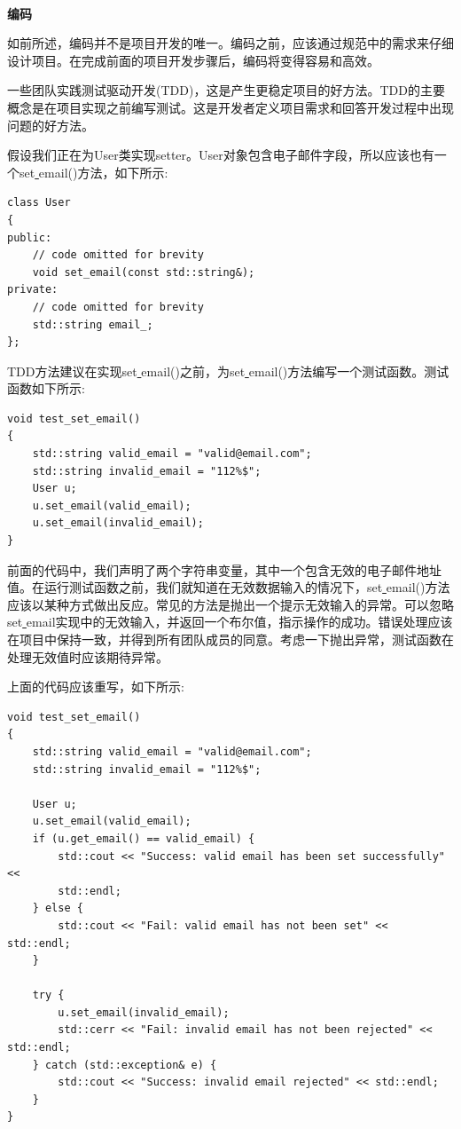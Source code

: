 \noindent\textbf{}\ \par
\textbf{编码} \ \par
如前所述，编码并不是项目开发的唯一。编码之前，应该通过规范中的需求来仔细设计项目。在完成前面的项目开发步骤后，编码将变得容易和高效。 \par
一些团队实践测试驱动开发(TDD)，这是产生更稳定项目的好方法。TDD的主要概念是在项目实现之前编写测试。这是开发者定义项目需求和回答开发过程中出现问题的好方法。 \par
假设我们正在为User类实现setter。User对象包含电子邮件字段，所以应该也有一个set\underline{ }email()方法，如下所示: \par

\begin{lstlisting}[caption={}]
class User
{
public:
	// code omitted for brevity
	void set_email(const std::string&);
private:
	// code omitted for brevity
	std::string email_;
};
\end{lstlisting}

TDD方法建议在实现set\underline{ }email()之前，为set\underline{ }email()方法编写一个测试函数。测试函数如下所示: \par

\begin{lstlisting}[caption={}]
void test_set_email()
{
	std::string valid_email = "valid@email.com";
	std::string invalid_email = "112%$";
	User u;
	u.set_email(valid_email);
	u.set_email(invalid_email);
}
\end{lstlisting}

前面的代码中，我们声明了两个字符串变量，其中一个包含无效的电子邮件地址值。在运行测试函数之前，我们就知道在无效数据输入的情况下，set\underline{ }email()方法应该以某种方式做出反应。常见的方法是抛出一个提示无效输入的异常。可以忽略set\underline{ }email实现中的无效输入，并返回一个布尔值，指示操作的成功。错误处理应该在项目中保持一致，并得到所有团队成员的同意。考虑一下抛出异常，测试函数在处理无效值时应该期待异常。 \par
上面的代码应该重写，如下所示: \par

\begin{lstlisting}[caption={}]
void test_set_email()
{
	std::string valid_email = "valid@email.com";
	std::string invalid_email = "112%$";
	
	User u;
	u.set_email(valid_email);
	if (u.get_email() == valid_email) {
		std::cout << "Success: valid email has been set successfully" <<
		std::endl;
	} else {
		std::cout << "Fail: valid email has not been set" << std::endl;
	}

	try {
		u.set_email(invalid_email);
		std::cerr << "Fail: invalid email has not been rejected" << std::endl;
	} catch (std::exception& e) {
		std::cout << "Success: invalid email rejected" << std::endl;
	}
}
\end{lstlisting}

